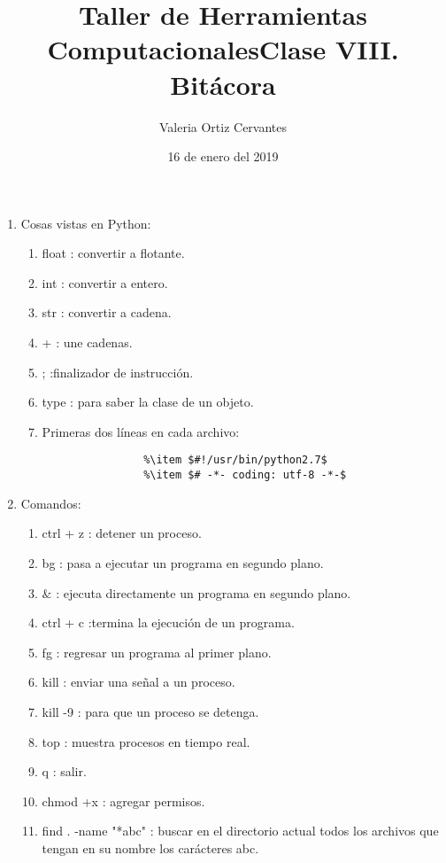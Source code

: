 \documentclass{article}
\title{\Huge Taller de Herramientas Computacionales}
\author{Valeria Ortiz Cervantes}
\date{16 de enero del 2019}
\begin{document}
	\maketitle
	\newpage
	\title{Clase VIII. Bitácora\\}
	\begin{enumerate}
		\item Cosas vistas en Python:
		\begin{enumerate}
			\item float : convertir a flotante.
		    \item int : convertir a entero.
		    \item str : convertir a cadena.
		    \item + : une cadenas.
		    \item ; :finalizador de instrucción.
		    \item type : para saber la clase de un objeto.
		    \item Primeras dos líneas en cada archivo:
		    \begin{verbatim}
		    	%\item $#!/usr/bin/python2.7$
		    	%\item $# -*- coding: utf-8 -*-$
		    \end{verbatim}
		\end{enumerate}
		\item Comandos: 
		\begin{enumerate}
			\item ctrl + z : detener un proceso.
			\item bg : pasa a ejecutar un programa en segundo plano.
			\item $\&$ : ejecuta directamente un programa en segundo plano. 
			\item ctrl + c :termina la ejecución de un programa.
			\item fg : regresar un programa al primer plano.
			\item kill : enviar una señal a un proceso.
			\item kill -9 : para que un proceso se detenga.
			\item top : muestra procesos en tiempo real.
			\item q : salir.
			\item chmod +x : agregar permisos.
			\item find . -name "*abc" : buscar en el directorio actual todos los archivos que tengan en su nombre los carácteres abc.
		\end{enumerate}

\end{enumerate}
\end{document}
